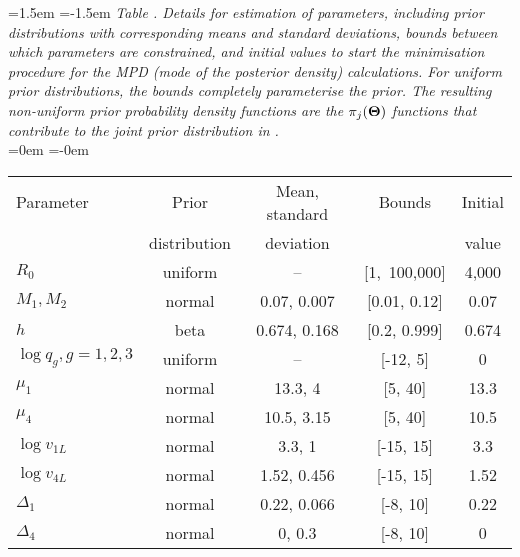 \begin{table}[tp]
\leftskip=1.5em
\parindent=-1.5em
{\it Table . Details for estimation of parameters, including prior distributions with corresponding means and standard deviations, bounds between which parameters are constrained, and initial values to start the minimisation procedure for the MPD (mode of the posterior density) calculations. For uniform prior distributions, the bounds completely parameterise the prior. The resulting non-uniform prior probability density functions are the $\pi_j({\bf \Theta})$ functions that contribute to the joint prior distribution in .}
\vsd \\
\leftskip=0em
\parindent=-0em
\begin{tabular}{lcccc} 
\hline
Parameter & Prior         & Mean, standard & Bounds & Initial\\ 
          &  distribution &  deviation     &  & value\\ 
\hline %
%
$R_0$ & uniform & -- & [1,~100,000] & 4,000\\
$M_{1}, M_{2}$ & normal & 0.07, 0.007 & [0.01, 0.12] & 0.07\\
$h$ & beta & 0.674, 0.168 & [0.2, 0.999] & 0.674\\
$\log q_g, g=1,2,3$ & uniform & -- & [-12, 5] & 0\\
$\mu_1$ & normal & 13.3, 4 & [5, 40] & 13.3\\
$\mu_4$ & normal & 10.5, 3.15 & [5, 40] & 10.5\\
$\log v_{1L}$ & normal & 3.3, 1 & [-15, 15] & 3.3\\
$\log v_{4L}$ & normal & 1.52, 0.456 & [-15, 15] & 1.52\\
$\Delta_1$ & normal & 0.22, 0.066 & [-8, 10] & 0.22\\
$\Delta_4$ & normal & 0, 0.3 & [-8, 10] & 0\\
\hline 
\end{tabular} 
\vsd
\end{table}

